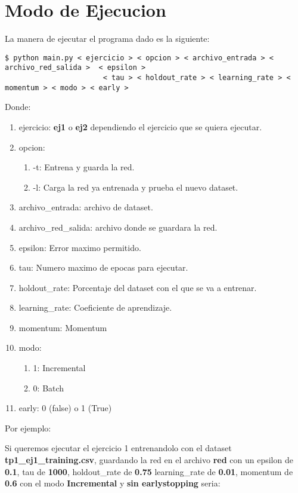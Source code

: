 \section{Modo de Ejecucion}

La manera de ejecutar el programa dado es la siguiente:


\begin{verbatim}
$ python main.py < ejercicio > < opcion > < archivo_entrada > < archivo_red_salida >  < epsilon > 
                       < tau > < holdout_rate > < learning_rate > < momentum > < modo > < early >
\end{verbatim}

Donde:

\begin{enumerate}
\item ejercicio: \textbf{ej1} o \textbf{ej2} dependiendo el ejercicio que se quiera ejecutar.
\item opcion: 
\begin{enumerate}
\item -t: Entrena y guarda la red.
\item -l: Carga la red ya entrenada y prueba el nuevo dataset.
\end{enumerate}
\item archivo\_entrada: archivo de dataset.
\item archivo\_red\_salida: archivo donde se guardara la red.
\item epsilon: Error maximo permitido.
\item tau: Numero maximo de epocas para ejecutar.
\item holdout\_rate: Porcentaje del dataset con el que se va a entrenar.
\item learning\_rate: Coeficiente de aprendizaje.
\item momentum: Momentum
\item modo: 
\begin{enumerate}
\item 1: Incremental
\item 0: Batch
\end{enumerate}
\item early: 0 (false) o 1 (True)
\end{enumerate}


Por ejemplo: 

Si queremos ejecutar el ejercicio 1 entrenandolo con el dataset \textbf{tp1\_ej1\_training.csv}, guardando la red en el archivo 
\textbf{red} con un epsilon de \textbf{0.1}, tau de \textbf{1000}, holdout\_rate de \textbf{0.75} learning\_rate de \textbf{0.01}, momentum de \textbf{0.6} con el modo \textbf{Incremental} y \textbf{sin earlystopping} seria:

